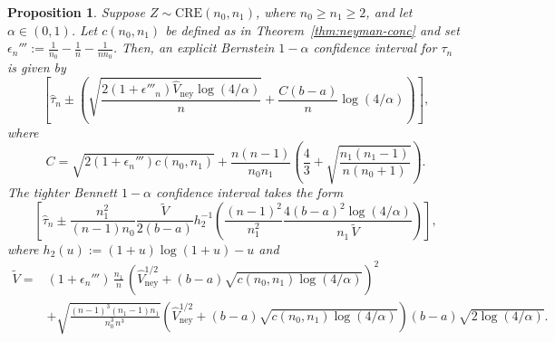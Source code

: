 \documentclass[aos]{imsart2}
\theoremstyle{plain}
\newtheorem{proposition}[theorem]{Proposition}
\theoremstyle{definition}
\newcommand{\vhn}{\hat{V}_{\mathrm{ney}}}
\newcommand{\tauh}{\hat{\tau}}
\newcommand{\cre}{\mathrm{CRE}}
\begin{document}
\begin{appendix}
\begin{proposition}\label{prop:cre-bernstein-bm}
    Suppose $Z \sim \cre(n_0,n_1)$, where $n_0 \geq n_1 \geq 2$, and let $\alpha \in (0,1)$. Let $c(n_0,n_1)$ be defined as in Theorem~\ref{thm:neyman-conc} and set $\epsilon_n''' := \frac{1}{n_0}-\frac{1}{n}-\frac{1}{nn_0}$. Then, an explicit Bernstein $1-\alpha$ confidence interval for $\tau_n$ is given by
    \begin{equation*}
        \left[\tauh_n \pm \left(\sqrt{\frac{2(1+\epsilon'''_n) \vhn\log(4/\alpha)}{n}} + \frac{C (b-a)}{n}\log(4/\alpha)\right)\right],
    \end{equation*}
    where
    \begin{equation*}
        C = \sqrt{2(1+\epsilon_n''')c(n_0,n_1)}+ \frac{n(n-1)}{n_0n_1}\left(\frac{4}{3}+\sqrt{\frac{n_1(n_1-1)}{n(n_0+1)}}\right).
    \end{equation*}
    The tighter Bennett $1-\alpha$ confidence interval takes the form
    \begin{equation*}
        \left[\tauh_n\pm \frac{n_1^2}{(n-1)n_0}  \frac{\tilde{V}}{2(b-a)} h^{-1}_2\left(\frac{(n-1)^2}{n_1^2}\frac{4(b-a)^2\log(4/\alpha)}{n_1\,\tilde{V}}\right)\right],
    \end{equation*}
    where $h_2(u):=(1+u)\log(1+u)-u$ and
    \begin{align*}
        \tilde{V} = &(1+\epsilon_n''')\,\frac{n_1}{n}\,\left(\vhn^{1/2}+ (b-a)\sqrt{c(n_0,n_1)\log(4/\alpha)}\right)^2\\
        &+ \sqrt{\frac{(n-1)^3(n_1-1)n_1}{n_0^3\,n^3}}\left(\vhn^{1/2} + (b-a)\sqrt{c(n_0,n_1)\log(4/\alpha)}\right)(b-a)\sqrt{2\log(4/\alpha)}.
    \end{align*}
\end{proposition}


\end{appendix}
\end{document}
